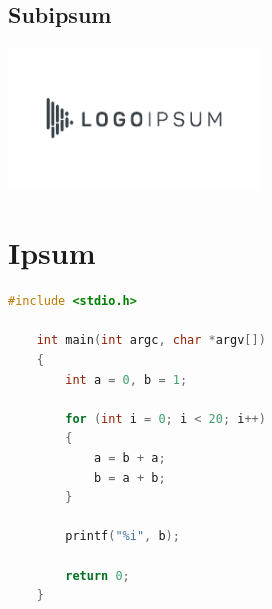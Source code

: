 \lipsum[5]

\subsection{Subipsum}

\lipsum[1]

\begin{center}
    \includegraphics[width=0.5\textwidth]{lipsum_logo_2}
\end{center}

\lipsum[2]

\section{Ipsum}

\begin{lstlisting}[language=c]
    #include <stdio.h>

    int main(int argc, char *argv[])
    {
        int a = 0, b = 1;
        
        for (int i = 0; i < 20; i++)
        {
            a = b + a;
            b = a + b;
        }

        printf("%i", b);

        return 0;
    }
\end{lstlisting}

\lipsum[2-4]